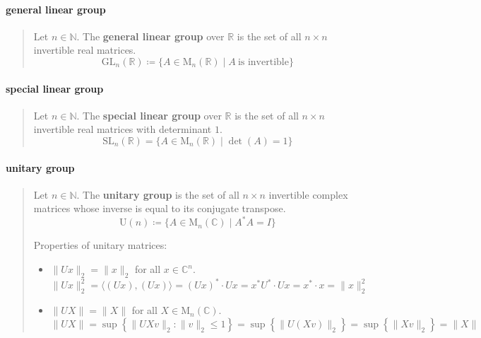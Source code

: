 \documentclass[letterpaper, 10pt]{article}
\theoremstyle{theostyle}
\begin{document}
\paragraph{general linear group}
\begin{quote}
    Let \(n \in \mathbb{N}\).
    The \textbf{general linear group} over \(\mathbb{R}\) is the set of all \(n \times n\) invertible real matrices.
    \[\mathrm{GL}_n (\mathbb{R}) \coloneqq \{A \in \mathrm{M}_n (\mathbb{R}) \mid A \ \text{is invertible}\}\]
\end{quote}

\paragraph{special linear group}
\begin{quote}
    Let \(n \in \mathbb{N}\).
    The \textbf{special linear group} over \(\mathbb{R}\) is the set of all \(n \times n\) invertible real matrices with determinant \(1\).
    \[\mathrm{SL}_n (\mathbb{R}) = \{A \in \mathrm{M}_n (\mathbb{R}) \mid \det{(A)} = 1\}\]
\end{quote}

\paragraph{unitary group}
\begin{quote}
    Let \(n \in \mathbb{N}\).
    The \textbf{unitary group} is the set of all \(n \times n\) invertible complex matrices whose inverse is equal to its conjugate transpose.
    \[\mathrm{U}(n) \coloneqq \{A \in \mathrm{M}_n (\mathbb{C}) \mid A^*A = I\}\]

    Properties of unitary matrices:
    \begin{itemize}
        \item \(\lVert U x \rVert_2 = \lVert x \rVert_2\) for all \(x \in \mathbb{C}^n\).
        \[\lVert Ux \rVert^2_2 = \langle (Ux), (Ux) \rangle = (Ux)^\ast \cdot Ux = x^\ast U^\ast \cdot U x = x^\ast \cdot x = \lVert x \rVert_2^2\]
        \item \(\lVert UX \rVert = \lVert X \rVert \) for all \(X \in \mathrm{M}_n(\mathbb{C})\).
        \[\lVert UX \rVert = \sup\left\{\lVert U X v \rVert_2 : \lVert v \rVert_2 \leq 1 \right\} = \sup\left\{\lVert U (X v) \rVert_2 \right\} = \sup\left\{\lVert X v \rVert_2 \right\} = \lVert X \rVert\]
    \end{itemize}
\end{quote}
\end{document}
